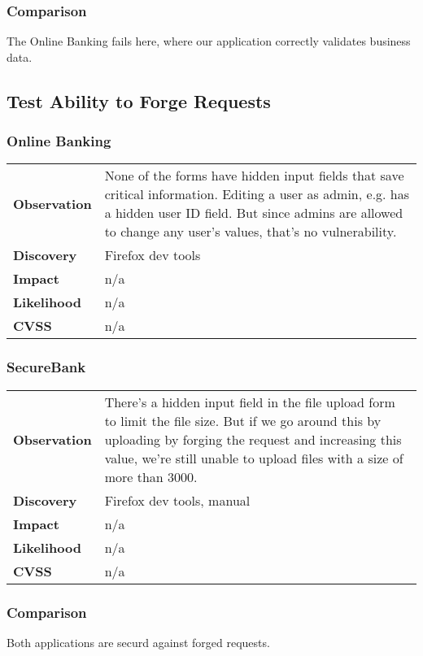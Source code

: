 \subsubsection*{Comparison}
The Online Banking fails here, where our application correctly validates business data.

\clearpage


\subsection{Test Ability to Forge Requests}
\subsubsection*{Online Banking}
\begin{tabular}{l|p{10cm}}

\textbf{Observation} & None of the forms have hidden input fields that save critical information. Editing a user as admin, e.g. has a hidden user ID field. But since admins are allowed to change any user's values, that's no vulnerability. \\
\textbf{Discovery} & Firefox dev tools \\
\textbf{Impact} & n/a \\
\textbf{Likelihood} & n/a \\
\textbf{CVSS} & n/a \\
\end{tabular}

\subsubsection*{SecureBank}
\begin{tabular}{l|p{10cm}}

\textbf{Observation} & There's a hidden input field in the file upload form to limit the file size. But if we go around this by uploading by forging the request and increasing this value, we're still unable to upload files with a size of more than 3000. \\
\textbf{Discovery} & Firefox dev tools, manual \\
\textbf{Impact} & n/a \\
\textbf{Likelihood} & n/a \\
\textbf{CVSS} & n/a \\
\end{tabular}

\subsubsection*{Comparison}
Both applications are securd against forged requests.

